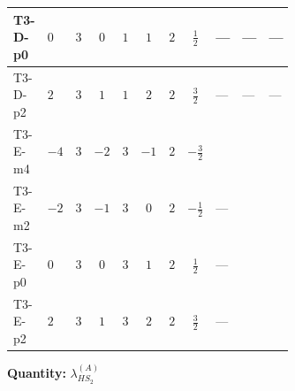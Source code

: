 \documentclass[8pt]{article}
\begin{document}
\begin{landscape}
\begin{longtable}{@{}llcccccc >{\raggedright\arraybackslash}p{0.21\linewidth} >{\raggedright\arraybackslash}p{0.21\linewidth} >{\raggedright\arraybackslash}p{0.21\linewidth}@{}}
\midrule
T3-D-p0 & $0$ & $3$ & $0$ & $1$ & $1$ & $2$ & $\frac{1}{2}$ & --- & --- & --- \\
\midrule
T3-D-p2 & $2$ & $3$ & $1$ & $1$ & $2$ & $2$ & $\frac{3}{2}$ & --- & --- & --- \\
\midrule
T3-E-m4 & $-4$ & $3$ & $-2$ & $3$ & $-1$ & $2$ & $-\frac{3}{2}$ & \scriptsize\adjustbox{max width=\linewidth}{$\begin{gathered} +{g_1}^2 \left(-4 {g_2}^2-\frac{15 {\lambda_{HS_2}^{(A)}}}{2}\right)\end{gathered}$} & \scriptsize\adjustbox{max width=\linewidth}{$\begin{gathered} -\frac{33 {g_2}^2 {\lambda_{HS_2}^{(A)}}}{2}\end{gathered}$} & \scriptsize\adjustbox{max width=\linewidth}{$\begin{gathered} +2 {\lambda_1} {\lambda_{HS_2}^{(A)}}\end{gathered}$} \\
\midrule
T3-E-m2 & $-2$ & $3$ & $-1$ & $3$ & $0$ & $2$ & $-\frac{1}{2}$ & --- & \scriptsize\adjustbox{max width=\linewidth}{$\begin{gathered} -\frac{33 {g_2}^2 {\lambda_{HS_2}^{(A)}}}{2}\end{gathered}$} & \scriptsize\adjustbox{max width=\linewidth}{$\begin{gathered} +2 {\lambda_1} {\lambda_{HS_2}^{(A)}}\end{gathered}$} \\
\midrule
T3-E-p0 & $0$ & $3$ & $0$ & $3$ & $1$ & $2$ & $\frac{1}{2}$ & --- & \scriptsize\adjustbox{max width=\linewidth}{$\begin{gathered} -\frac{33 {g_2}^2 {\lambda_{HS_2}^{(A)}}}{2}\end{gathered}$} & \scriptsize\adjustbox{max width=\linewidth}{$\begin{gathered} +2 {\lambda_1} {\lambda_{HS_2}^{(A)}}\end{gathered}$} \\
\midrule
T3-E-p2 & $2$ & $3$ & $1$ & $3$ & $2$ & $2$ & $\frac{3}{2}$ & --- & \scriptsize\adjustbox{max width=\linewidth}{$\begin{gathered} -\frac{33 {g_2}^2 {\lambda_{HS_2}^{(A)}}}{2}\end{gathered}$} & \scriptsize\adjustbox{max width=\linewidth}{$\begin{gathered} +2 {\lambda_1} {\lambda_{HS_2}^{(A)}}\end{gathered}$} \\
\midrule
\bottomrule
\end{longtable}
\clearpage
\noindent\textbf{Quantity: }$\lambda_{HS_2}^{(A)}$\par\smallskip

\end{landscape}
\end{document}

